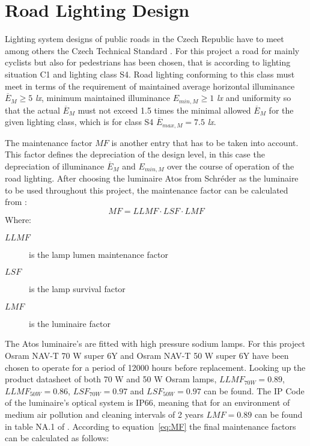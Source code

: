 \section{Road Lighting Design}
\label{sec:Road_Lighting_Design}
Lighting system designs of public roads in the Czech Republic have to meet among others the Czech Technical Standard \cite{CSN_EN_13201-2}. For this project a road for mainly cyclists but also for pedestrians has been chosen, that is according to \cite{CSN_EN_13201-1} lighting situation C1 and lighting class S4. Road lighting conforming to this class must meet in terms of \cite{CSN_EN_13201-2} the requirement of maintained average horizontal illuminance $\overline{E}_{M}\geq 5$ \textit{lx}, minimum maintained illuminance $E_{min,M}\geq 1$ \textit{lx} and uniformity so that the actual $\overline{E}_{M}$ must not exceed 1.5 times the minimal allowed $\overline{E}_{M}$ for the given lighting class, which is for class S4 $\overline{E}_{max,M} = 7.5$ \textit{lx}.

The maintenance factor $MF$ is another entry that has to be taken into account. This factor defines the depreciation of the design level, in this case the depreciation of illuminance $\overline{E}_{M}$ and $E_{min,M}$ over the course of operation of the road lighting. After choosing the luminaire Atos from Schr\'{e}der as the luminaire to be used throughout this project, the maintenance factor can be calculated from \cite{CSN_EN_13201-2_Z1}:
\begin{equation} \label{eq:MF}
MF = LLMF \cdot LSF \cdot LMF
\end{equation}
Where:
\begin{description}
	\item[$LLMF$] is the lamp lumen maintenance factor
	\item[$LSF$] is the lamp survival factor
	\item[$LMF$] is the luminaire factor
\end{description}

The Atos luminaire's are fitted with high pressure sodium lamps. For this project Osram NAV-T 70 W super 6Y and Osram NAV-T 50 W super 6Y have been chosen to operate for a period of 12000 hours before replacement. Looking up the product datasheet \cite{Osram} of both 70 W and 50 W Osram lamps, $LLMF_{70W}=0.89$, $LLMF_{50W}=0.86$, $LSF_{70W}=0.97$ and $LSF_{50W}=0.97$ can be found. The IP Code of the luminaire's optical system is IP66, meaning that for an environment of medium air pollution and cleaning intervals of 2 years $LMF=0.89$ can be found in table NA.1 of \cite{CSN_EN_13201-2_Z1}. According to equation~\ref{eq:MF} the final maintenance factors can be calculated as follows:

